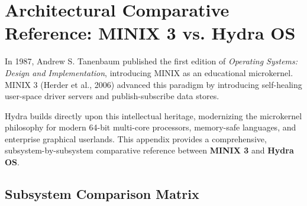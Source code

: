 \chapter{Architectural Comparative Reference: MINIX 3 vs. Hydra OS}
\label{app:comparison}

In 1987, Andrew S. Tanenbaum published the first edition of \textit{Operating Systems: Design and Implementation}, introducing MINIX as an educational microkernel. MINIX 3 (Herder et al., 2006) advanced this paradigm by introducing self-healing user-space driver servers and publish-subscribe data stores.

Hydra builds directly upon this intellectual heritage, modernizing the microkernel philosophy for modern 64-bit multi-core processors, memory-safe languages, and enterprise graphical userlands. This appendix provides a comprehensive, subsystem-by-subsystem comparative reference between \textbf{MINIX 3} and \textbf{Hydra OS}.

\section{Subsystem Comparison Matrix}
\label{sec:comp_matrix}

